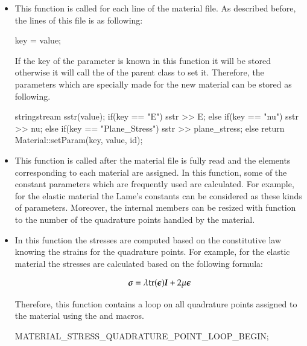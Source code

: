 \begin{itemize}

\item {} This function is called for each line of the material
  file. As described before, the lines of this file is as following:
  \begin {cpp}
    key = value;
  \end{cpp}
  If the key of the parameter is known in this function it will be stored
  otherwise it will call the  of the parent class to set it.
  Therefore, the parameters which are specially made for the new material can be
  stored as following.

  \begin{cpp}
    stringstream sstr(value);
    if(key == "E") { sstr >> E; }
    else if(key == "nu") { sstr >> nu; }
    else if(key == "Plane_Stress") { sstr >> plane_stress; }
    else { return Material::setParam(key, value, id); }
  \end{cpp}

\item {} This function is called after the material file is
  fully read and the elements corresponding to each material are assigned.  In
  this function, some of the constant parameters which are frequently used are
  calculated. For example, for the elastic material the Lame's constants can be
  considered as these kinds of parameters.  Moreover, the internal members can
  be resized with  function to the number of the
  quadrature points handled by the material.

\item {} In this function the stresses are computed based on
  the constitutive law knowing the strains for the quadrature points.  For
  example, for the elastic material the stresses are calculated based on the
  following formula:

 \begin{equation}\label{eqn:smm:constitutive_elastic}
    \boldsymbol{\sigma } =\lambda\mathrm{tr}(\boldsymbol{\epsilon})\boldsymbol{I}+2 \mu \boldsymbol{\epsilon}
  \end{equation}

Therefore, this
  function contains  a loop on  all quadrature points assigned  to the
  material using the
   and
    macros.

  \begin{cpp}
    MATERIAL_STRESS_QUADRATURE_POINT_LOOP_BEGIN;


\end{cpp}
\end{itemize}

